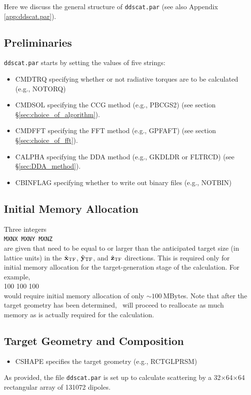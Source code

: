 Here we discuss the general structure of {\tt ddscat.par}
(see also Appendix \ref{app:ddscat.par}).
\subsection{ Preliminaries}
{\tt ddscat.par} starts by setting the values of five strings:
\begin{itemize}
\item CMDTRQ specifying whether or not radiative torques
      are to be calculated (e.g., NOTORQ)
\item CMDSOL specifying the CCG method (e.g., PBCGS2)
      (see section \S\ref{sec:choice_of_algorithm}). 
\item CMDFFT specifying the FFT method (e.g., GPFAFT)
      (see section \S\ref{sec:choice_of_fft}).
\item CALPHA specifying the DDA method (e.g., GKDLDR or FLTRCD)
      (see \S\ref{sec:DDA_method}).
\item CBINFLAG specifying whether to write out binary files (e.g., NOTBIN)
\end{itemize}
\subsection{ Initial Memory Allocation}
Three integers\\
{\tt MXNX  MXNY  MXNZ}\\
are given that need to be equal to or larger than
the anticipated target size (in lattice units) in the $\hat{\bf x}_{\rm TF}$, $\hat{\bf y}_{\rm TF}$, and
$\hat{\bf z}_{\rm TF}$ directions.  This is required only for initial memory allocation for
the target-generation stage of the calculation.
For example,\\
100 100 100\\
would require initial memory allocation of only $\sim100~$MBytes.
Note that after the target geometry has been determined, \ddscatv\ will proceed
to reallocate as much memory as is actually required for the calculation.

\subsection{ Target Geometry and Composition}  
\begin{itemize}
\item CSHAPE specifies the target geometry (e.g., RCTGLPRSM)
\end{itemize}
As provided,
the file {\tt ddscat.par} 
is set up to calculate scattering by a 32$\times$64$\times$64 
rectangular array of 131072
dipoles.

